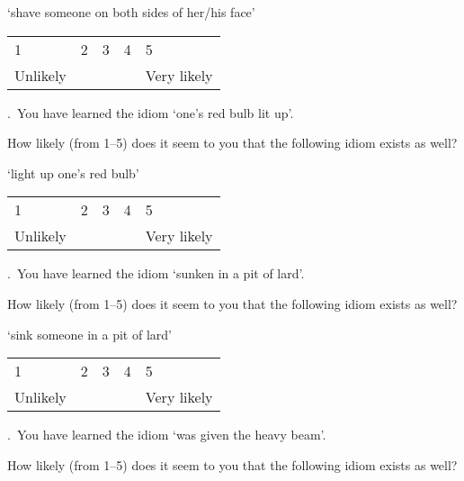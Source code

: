\documentclass[output=paper]{langsci/langscibook}
\begin{document}
\begin{paperappendix}
\noindent \enquote*{{shave someone on both sides of her/his face}}\vspace{.5\baselineskip}

\noindent \begin{tabularx}{\textwidth}{XXXXX}
        1 & 2 & 3 & 4 & 5\\
        Unlikely & & & & Very likely\\
        \end{tabularx}\vspace{1\baselineskip}

.\ You have learned the idiom \enquote*{{one's red bulb lit up}}.


\noindent How likely (from 1--5) does it seem to you that the following idiom exists
    as well?\vspace{.5\baselineskip}

\noindent \enquote*{{light up one's red bulb}}\vspace{.5\baselineskip}

\noindent \begin{tabularx}{\textwidth}{XXXXX}
        1 & 2 & 3 & 4 & 5\\
        Unlikely & & & & Very likely\\
        \end{tabularx}\vspace{1\baselineskip}

.\ You have learned the idiom \enquote*{{sunken in a pit of lard}}.

\noindent How likely (from 1--5) does it seem to you that the following idiom exists
    as well?\vspace{.5\baselineskip}

\noindent \enquote*{{sink someone in a pit of lard}}\vspace{.5\baselineskip}

\noindent \begin{tabularx}{\textwidth}{XXXXX}
        1 & 2 & 3 & 4 & 5\\
        Unlikely & & & & Very likely\\
        \end{tabularx}\vspace{1\baselineskip}

.\ You have learned the idiom \enquote*{{was given the heavy beam}}.

\noindent How likely (from 1--5) does it seem to you that the following idiom exists
    as well?\vspace{.5\baselineskip}


\end{paperappendix}
\end{document}
